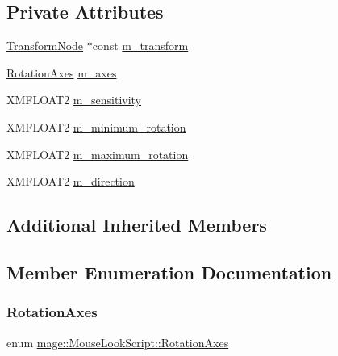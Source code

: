 \subsection*{Private Attributes}
\begin{DoxyCompactItemize}
\item 
\hyperlink{structmage_1_1_transform_node}{Transform\+Node} $\ast$const \hyperlink{classmage_1_1_mouse_look_script_a419b30350dc3eed30ae2f983812391f5}{m\+\_\+transform}
\item 
\hyperlink{classmage_1_1_mouse_look_script_af63fd955f796c11e0378813e5d1ab5f8}{Rotation\+Axes} \hyperlink{classmage_1_1_mouse_look_script_ab5df1b96d5860a9b8f30256e7c89b26b}{m\+\_\+axes}
\item 
X\+M\+F\+L\+O\+A\+T2 \hyperlink{classmage_1_1_mouse_look_script_a4f38b9bd8e7271503a70753ce6a923c7}{m\+\_\+sensitivity}
\item 
X\+M\+F\+L\+O\+A\+T2 \hyperlink{classmage_1_1_mouse_look_script_ad09bda241666f60dfc408500cafd073d}{m\+\_\+minimum\+\_\+rotation}
\item 
X\+M\+F\+L\+O\+A\+T2 \hyperlink{classmage_1_1_mouse_look_script_a0d5f2933555b76efd7cf83c7672574dd}{m\+\_\+maximum\+\_\+rotation}
\item 
X\+M\+F\+L\+O\+A\+T2 \hyperlink{classmage_1_1_mouse_look_script_a07c9a61869dab687a0426fa0c4b41fa7}{m\+\_\+direction}
\end{DoxyCompactItemize}
\subsection*{Additional Inherited Members}


\subsection{Member Enumeration Documentation}
\hypertarget{classmage_1_1_mouse_look_script_af63fd955f796c11e0378813e5d1ab5f8}{}\label{classmage_1_1_mouse_look_script_af63fd955f796c11e0378813e5d1ab5f8} 
\subsubsection{\texorpdfstring{Rotation\+Axes}{RotationAxes}}
{\footnotesize\ttfamily enum \hyperlink{classmage_1_1_mouse_look_script_af63fd955f796c11e0378813e5d1ab5f8}{mage\+::\+Mouse\+Look\+Script\+::\+Rotation\+Axes}\hspace{0.3cm}{\ttfamily [strong]}}

